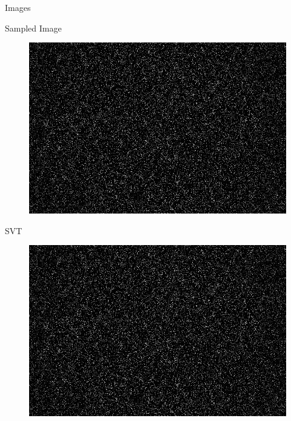 \documentclass{beamer}
\begin{document}
\begin{frame}{Images}
	\vspace{-0.2cm}
	\begin{multicols}{2}
		\hspace{0.7cm}Sampled Image
		\vspace{-0.2cm}
		\begin{figure}[h]
			\centering
			\includegraphics[width=0.8\linewidth]{./../data/images/presentation/p4_2_01_20.jpg}
		\end{figure}
		\hspace{0.7cm}SVT
		\vspace{-0.2cm}
		\begin{figure}[h]
			\centering
			\includegraphics[width=0.8\linewidth]{./../data/images/presentation/p4_2_01_20.jpg}
		\end{figure}
	\end{multicols}
	

\end{frame}
\end{document}
